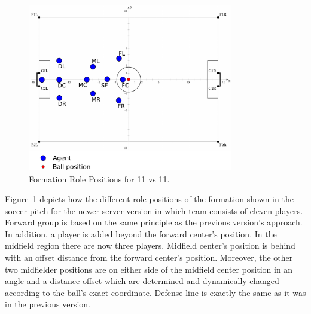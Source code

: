 \begin{figure}[t!]
\centering
  \includegraphics[width=0.8\textwidth]{Chapter4/figures/Formation11_0.pdf}
  \caption{Formation Role Positions for 11 vs 11.} 
  \label{fig:Formation11_0}
\end{figure}


Figure~\ref{fig:Formation11_0} depicts how the different role positions of the formation shown in the soccer pitch for the newer server version in which team consists of eleven players. Forward group is based on the same principle as the previous version's approach. In addition, a player is added beyond the forward center's position. In the midfield region there are now three players. Midfield center's position is behind with an offset distance from the forward center's position. Moreover, the other two midfielder positions are on either side of the midfield center position in an angle and a distance offset which are determined and dynamically changed according to the ball's exact coordinate. Defense line is exactly the same as it was in the previous version.

